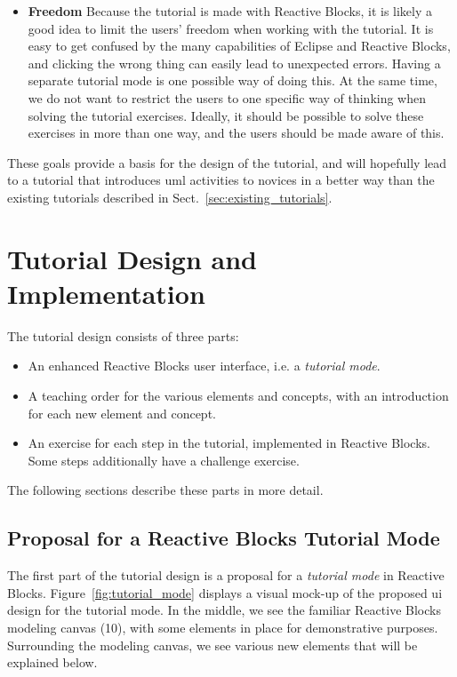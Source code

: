 \begin{itemize}
	\item{\textbf{Freedom}} Because the tutorial is made with Reactive Blocks, it is likely a good idea to limit the users' freedom when working with the tutorial. It is easy to get confused by the many capabilities of Eclipse and Reactive Blocks, and clicking the wrong thing can easily lead to unexpected errors. Having a separate tutorial mode is one possible way of doing this. At the same time, we do not want to restrict the users to one specific way of thinking when solving the tutorial exercises. Ideally, it should be possible to solve these exercises in more than one way, and the users should be made aware of this.
\end{itemize}

\noindent
These goals provide a basis for the design of the tutorial, and will hopefully lead to a tutorial that introduces \gls{uml} activities to novices in a better way than the existing tutorials described in Sect.~\ref{sec:existing_tutorials}.

\section{Tutorial Design and Implementation}
\label{sec:tutorial_design_implementation}
The tutorial design consists of three parts:

\begin{itemize}
	\item An enhanced Reactive Blocks user interface, i.e. a \emph{tutorial mode}.
	\item A teaching order for the various elements and concepts, with an introduction for each new element and concept.
	\item An exercise for each step in the tutorial, implemented in Reactive Blocks. Some steps additionally have a challenge exercise.
\end{itemize}

\noindent
The following sections describe these parts in more detail.

\subsection{Proposal for a Reactive Blocks Tutorial Mode}
\label{sec:reactive_blocks_tutorial_mode}
The first part of the tutorial design is a proposal for a \emph{tutorial mode} in Reactive Blocks. Figure~\ref{fig:tutorial_mode} displays a visual mock-up of the proposed \gls{ui} design for the tutorial mode. In the middle, we see the familiar Reactive Blocks modeling canvas (10), with some elements in place for demonstrative purposes. Surrounding the modeling canvas, we see various new elements that will be explained below.

